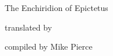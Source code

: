 
\begin{titlepage}


    \noindent
        \makebox[0pt][l]{\rule{1.3\textwidth}{1pt}}

    \color{black}\noindent
        \textsf{\Huge{The Enchiridion of Epictetus}}

    \color{black}\noindent
        \textsf{translated by \AuthorFull}

    \vfill

    \color{white}\noindent
        \textsf{compiled by Mike Pierce}

\end{titlepage}

